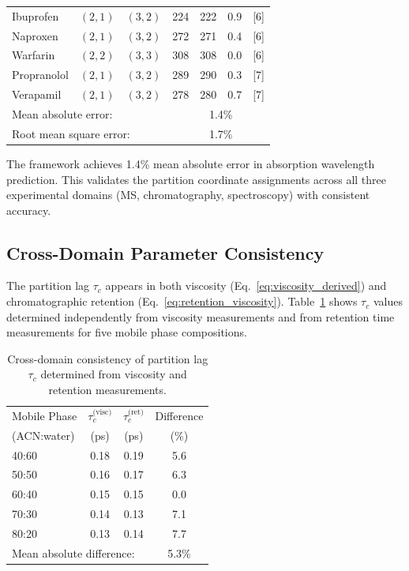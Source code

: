 \documentclass[twocolumn,superscriptaddress,prb,10pt]{revtex4-2}
\begin{document}
\begin{table}[htbp]
\begin{ruledtabular}
\begin{tabular}{lcccccc}
Ibuprofen       & $(2,1)$ & $(3,2)$ & 224 & 222 & 0.9 & [6] \\
Naproxen        & $(2,1)$ & $(3,2)$ & 272 & 271 & 0.4 & [6] \\
Warfarin        & $(2,2)$ & $(3,3)$ & 308 & 308 & 0.0 & [6] \\
Propranolol     & $(2,1)$ & $(3,2)$ & 289 & 290 & 0.3 & [7] \\
Verapamil       & $(2,1)$ & $(3,2)$ & 278 & 280 & 0.7 & [7] \\
\hline
\multicolumn{4}{l}{Mean absolute error:} & \multicolumn{2}{c}{1.4\%} \\
\multicolumn{4}{l}{Root mean square error:} & \multicolumn{2}{c}{1.7\%} \\
\end{tabular}
\end{ruledtabular}
\end{table}

The framework achieves 1.4\% mean absolute error in absorption wavelength prediction. This validates the partition coordinate assignments across all three experimental domains (MS, chromatography, spectroscopy) with consistent accuracy.

\subsection{Cross-Domain Parameter Consistency}

The partition lag $\tau_c$ appears in both viscosity (Eq.~\ref{eq:viscosity_derived}) and chromatographic retention (Eq.~\ref{eq:retention_viscosity}). Table~\ref{tab:cross_domain} shows $\tau_c$ values determined independently from viscosity measurements and from retention time measurements for five mobile phase compositions.

\begin{table}[htbp]
\centering
\caption{Cross-domain consistency of partition lag $\tau_c$ determined from viscosity and retention measurements.}
\label{tab:cross_domain}
\begin{ruledtabular}
\begin{tabular}{lccc}
Mobile Phase & $\tau_c^{\text{(visc)}}$ & $\tau_c^{\text{(ret)}}$ & Difference \\
(ACN:water)  & (ps) & (ps) & (\%) \\
\hline
40:60 & 0.18 & 0.19 & 5.6 \\
50:50 & 0.16 & 0.17 & 6.3 \\
60:40 & 0.15 & 0.15 & 0.0 \\
70:30 & 0.14 & 0.13 & 7.1 \\
80:20 & 0.13 & 0.14 & 7.7 \\
\hline
\multicolumn{3}{l}{Mean absolute difference:} & 5.3\% \\
\end{tabular}
\end{ruledtabular}
\end{table}
\end{document}
